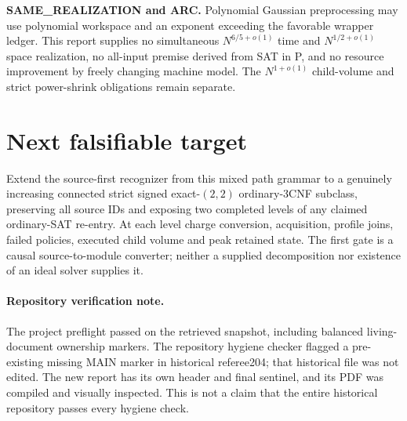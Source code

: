 \documentclass[11pt]{article}
\begin{document}
\textbf{SAME\_REALIZATION and ARC.} Polynomial Gaussian preprocessing may use polynomial workspace and an exponent exceeding the favorable wrapper ledger. This report supplies no simultaneous $N^{6/5+o(1)}$ time and $N^{1/2+o(1)}$ space realization, no all-input premise derived from SAT in P, and no resource improvement by freely changing machine model. The $N^{1+o(1)}$ child-volume and strict power-shrink obligations remain separate.

\section{Next falsifiable target}
Extend the source-first recognizer from this mixed path grammar to a genuinely increasing connected strict signed exact-$(2,2)$ ordinary-3CNF subclass, preserving all source IDs and exposing two completed levels of any claimed ordinary-SAT re-entry. At each level charge conversion, acquisition, profile joins, failed policies, executed child volume and peak retained state. The first gate is a causal source-to-module converter; neither a supplied decomposition nor existence of an ideal solver supplies it.

\paragraph{Repository verification note.}
The project preflight passed on the retrieved snapshot, including balanced living-document ownership markers. The repository hygiene checker flagged a pre-existing missing MAIN marker in historical referee204; that historical file was not edited. The new report has its own header and final sentinel, and its PDF was compiled and visually inspected. This is not a claim that the entire historical repository passes every hygiene check.



\end{document}
